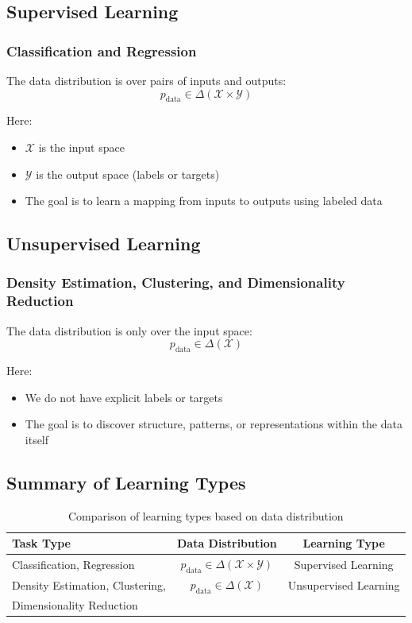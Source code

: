 \documentclass[11pt,a4paper]{article}
\theoremstyle{definition}
\theoremstyle{plain}
\theoremstyle{remark}
\begin{document}
\subsection{Supervised Learning}

\subsubsection{Classification and Regression}

The data distribution is over pairs of inputs and outputs:
\[
p_{\text{data}} \in \Delta(\mathcal{X} \times \mathcal{Y})
\]

Here:
\begin{itemize}
    \item $\mathcal{X}$ is the input space
    \item $\mathcal{Y}$ is the output space (labels or targets)
    \item The goal is to learn a mapping from inputs to outputs using labeled data
\end{itemize}

\subsection{Unsupervised Learning}

\subsubsection{Density Estimation, Clustering, and Dimensionality Reduction}

The data distribution is only over the input space:
\[
p_{\text{data}} \in \Delta(\mathcal{X})
\]

Here:
\begin{itemize}
    \item We do not have explicit labels or targets
    \item The goal is to discover structure, patterns, or representations within the data itself
\end{itemize}

\subsection{Summary of Learning Types}

\begin{table}[h]
\centering
\begin{tabular}{|l|c|c|}
\hline
\textbf{Task Type} & \textbf{Data Distribution} & \textbf{Learning Type} \\
\hline
Classification, Regression & $p_{\text{data}} \in \Delta(\mathcal{X} \times \mathcal{Y})$ & Supervised Learning \\
\hline
Density Estimation, Clustering, & $p_{\text{data}} \in \Delta(\mathcal{X})$ & Unsupervised Learning \\
Dimensionality Reduction & & \\
\hline
\end{tabular}
\caption{Comparison of learning types based on data distribution}
\end{table}
\end{document}
